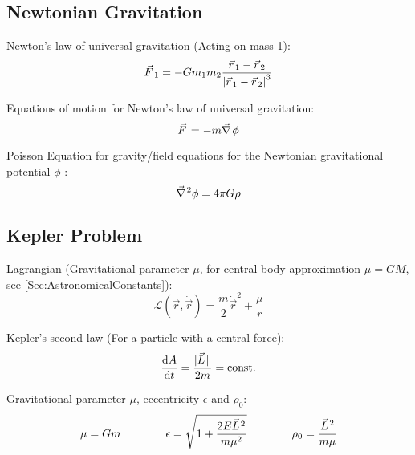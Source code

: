 	\subsection{Newtonian Gravitation}
		\noindent
		Newton's law of universal gravitation (Acting on mass 1):
		\begin{equation}
			\vec{F}_1 = - G m_1 m_2 \frac{\vec{r}_1-\vec{r}_2}{\abs{\vec{r}_1-\vec{r}_2}^3}
		\end{equation}

		\noindent
		Equations of motion for Newton's law of universal gravitation:
		\begin{equation}
			\vec{F}=-m\Nabla\phi
		\end{equation}

		\noindent
		Poisson Equation for gravity/field equations for the Newtonian gravitational potential $\phi$ :
		\begin{equation}
			\Nabla^2\phi = 4\pi G\rho
		\end{equation}


	\subsection{Kepler Problem}
		\noindent
		Lagrangian (Gravitational parameter $\mu$, for central body approximation $\mu=GM$, see \ref{Sec:AstronomicalConstants}):
		\begin{equation}
			\mathcal{L}(\vec{r},\dot{\vec{r}}) = \frac{m}{2} \dot{\vec{r}}^2 + \frac{\mu}{r}
		\end{equation}

		\noindent
		Kepler's second law (For a particle with a central force):
		\begin{equation}
			\dv{A}{t} = \frac{\abs*{\vec{L}}}{2 m} = \const
		\end{equation}

		\noindent
		Gravitational parameter  $\mu$, eccentricity $\epsilon$ and $\rho_0$:
		\begin{equation}
			\begin{aligned}
				\mu &= G m &\hsp
				\epsilon &= \sqrt{1+\frac{2 E \vec{L}^2}{m \mu^2}} &\hsp
				\rho_0 &= \frac{\vec{L}^2}{m\mu} \\
			\end{aligned}
		\end{equation}

